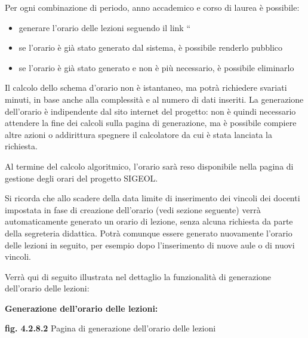\documentclass[11pt,a4paper]{article}
\begin{document}
Per ogni combinazione di periodo, anno accademico e corso di laurea è possibile:
\begin{itemize}
 \item generare l'orario delle lezioni seguendo il link ``
 \item se l'orario è già stato generato dal sistema, è possibile renderlo pubblico
 \item se l'orario è già stato generato e non è più necessario, è possibile eliminarlo
\end{itemize}
Il calcolo dello schema d'orario non è istantaneo, ma potrà richiedere svariati minuti, in base anche alla complessità e al numero di dati inseriti.
La generazione dell'orario è indipendente dal sito internet del progetto: non è quindi necessario attendere la fine dei calcoli sulla pagina di generazione, ma è possibile compiere altre azioni o addirittura spegnere il calcolatore da cui è stata lanciata la richiesta.

Al termine del calcolo algoritmico, l'orario sarà reso disponibile nella pagina di gestione degli orari del progetto SIGEOL.

Si ricorda che allo scadere della data limite di inserimento dei vincoli dei docenti impostata in fase di creazione dell'orario (vedi sezione seguente) verrà automaticamente generato un orario di lezione, senza alcuna richiesta da parte della segreteria didattica. Potrà comunque essere generato nuovamente l'orario delle lezioni in seguito, per esempio dopo l'inserimento di nuove aule o di nuovi vincoli.

Verrà qui di seguito illustrata nel dettaglio la funzionalità di generazione dell'orario delle lezioni:
\newline \newline
\begin{large}\textbf{Generazione dell'orario delle lezioni:}\end{large}

\bigskip
\begin{center}
	\textbf{fig. 4.2.8.2} Pagina di generazione dell'orario delle lezioni\\
\end{center}
\bigskip
\end{document}
